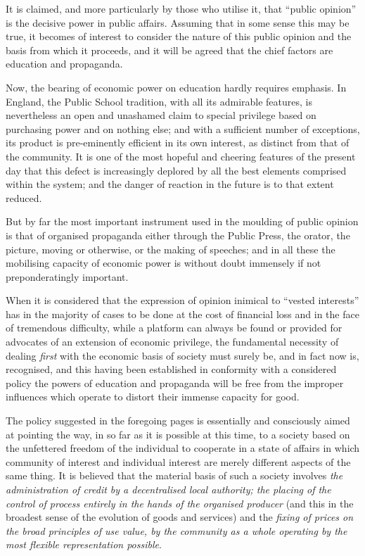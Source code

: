 \documentclass{book}
\begin{document}
It is claimed, and more particularly by those who utilise it, that “public opinion” is the decisive power in public affairs. Assuming that in some sense this may be true, it becomes of interest to consider the nature of this public opinion and the basis from which it proceeds, and it will be agreed that the chief factors are education and propaganda.

Now, the bearing of economic power on education hardly requires emphasis. In England, the Public School tradition, with all its admirable features, is nevertheless an open and unashamed claim to special privilege based on purchasing power and on nothing else; and with a sufficient number of exceptions, its product is pre-eminently efficient in its own interest, as distinct from that of the community. It is one of the most hopeful and cheering features of the present day that this defect is increasingly deplored by all the best elements comprised within the system; and the danger of reaction in the future is to that extent reduced.

But by far the most important instrument used in the moulding of public opinion is that of organised propaganda either through the Public Press, the orator, the picture, moving or otherwise, or the making of speeches; and in all these the mobilising capacity of economic power is without doubt immensely if not preponderatingly important.

When it is considered that the expression of opinion inimical to “vested interests” has in the majority of cases to be done at the cost of financial loss and in the face of tremendous difficulty, while a platform can always be found or provided for advocates of an extension of economic privilege, the fundamental necessity of dealing \emph{first} with the economic basis of society must surely be, and in fact now is, recognised, and this having been established in conformity with a considered policy the powers of education and propaganda will be free from the improper influences which operate to distort their immense capacity for good.

The policy suggested in the foregoing pages is essentially and consciously aimed at pointing the way, in so far as it is possible at this time, to a society based on the unfettered freedom of the individual to cooperate in a state of affairs in which community of interest and individual interest are merely different aspects of the same thing. It is believed that the material basis of such a society involves \emph{the administration of credit by a decentralised local authority; the placing of the control of process entirely in the hands of the organised producer} (and this in the broadest sense of the evolution of goods and services) and the \emph{fixing of prices on the broad principles of use value, by the community as a whole operating by the most flexible representation possible}.
\end{document}
